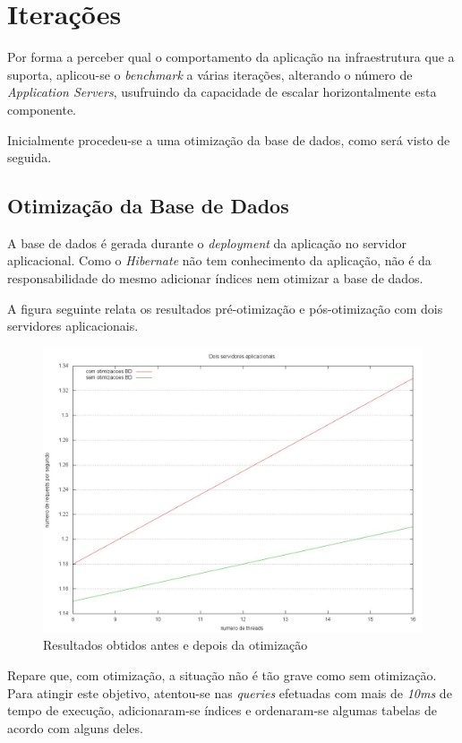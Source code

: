 \section{Iterações}

Por forma a perceber qual o comportamento da aplicação na infraestrutura que a suporta, aplicou-se o \emph{benchmark} a várias iterações, alterando o número de \emph{Application Servers}, usufruindo da capacidade de escalar horizontalmente esta componente.

Inicialmente procedeu-se a uma otimização da base de dados, como será visto de seguida.

\subsection{Otimização da Base de Dados}

A base de dados é gerada durante o \emph{deployment} da aplicação no servidor aplicacional. Como o \emph{Hibernate} não tem conhecimento da aplicação, não é da responsabilidade do mesmo adicionar índices nem otimizar a base de dados.

A figura seguinte relata os resultados pré-otimização e pós-otimização com dois servidores aplicacionais.

\begin{figure}[ht]
\centerline{\includegraphics[width=1\textwidth]{images/benchmark/optimization}}
\label{fig:optimization}
\caption{Resultados obtidos antes e depois da otimização}
\end{figure}

Repare que, com otimização, a situação não é tão grave como sem otimização. Para atingir este objetivo, atentou-se nas \emph{queries} efetuadas com mais de \emph{10ms} de tempo de execução, adicionaram-se índices e ordenaram-se algumas tabelas de acordo com alguns deles.


